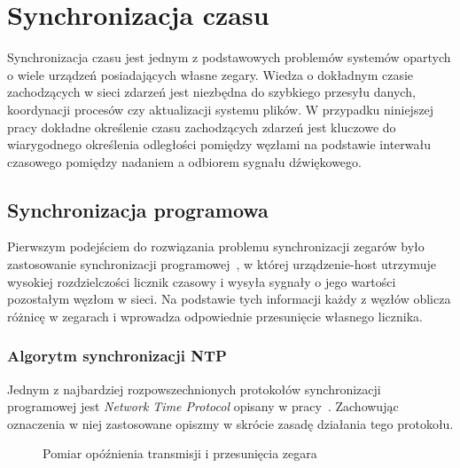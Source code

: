 \chapter{Synchronizacja czasu}\label{chap:time_sync}

Synchronizacja czasu jest jednym z podstawowych problemów systemów opartych o wiele urządzeń posiadających własne zegary. Wiedza o dokładnym czasie zachodzących w sieci zdarzeń jest niezbędna do szybkiego przesyłu danych, koordynacji procesów czy aktualizacji systemu plików. W przypadku niniejszej pracy dokładne określenie czasu zachodzących zdarzeń jest kluczowe do wiarygodnego określenia odległości pomiędzy węzłami na podstawie interwału czasowego pomiędzy nadaniem a odbiorem sygnału dźwiękowego.

\section{Synchronizacja programowa}

Pierwszym podejściem do rozwiązania problemu synchronizacji zegarów było zastosowanie synchronizacji programowej~\cite{6066334}, w której urządzenie-host utrzymuje wysokiej rozdzielczości licznik czasowy i wysyła sygnały o jego wartości pozostałym węzłom w sieci. Na podstawie tych informacji każdy z węzłów oblicza różnicę w zegarach i wprowadza odpowiednie przesunięcie własnego licznika.

\subsection{Algorytm synchronizacji NTP}\label{sec:ntp_sync}

Jednym z najbardziej rozpowszechnionych protokołów synchronizacji programowej jest \textit{Network Time Protocol} opisany w pracy~\cite{103043}. Zachowując oznaczenia w niej zastosowane opiszmy w skrócie zasadę działania tego protokołu.

\begin{figure}[H]
    \centering
    \caption{Pomiar opóźnienia transmisji i przesunięcia zegara}
    \label{fig:ntp}
\end{figure}

